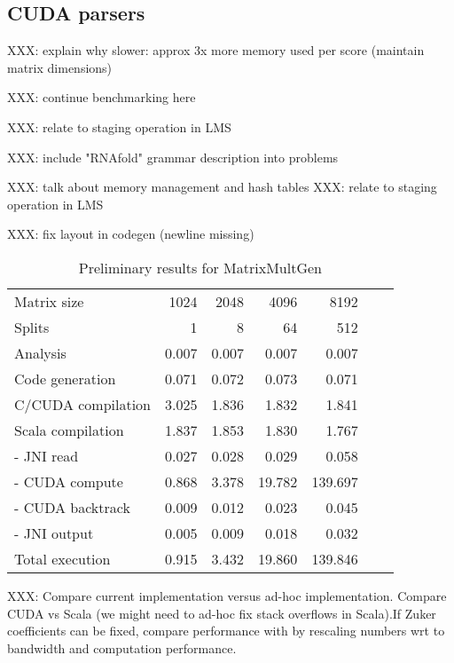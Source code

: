 \documentclass[11pt]{article}
\begin{document}
\subsection{CUDA parsers}
{\color{red} XXX: explain why slower: approx 3x more memory used per score (maintain matrix dimensions)

XXX: continue benchmarking here

XXX: relate to staging operation in LMS

XXX: include "RNAfold" grammar description into problems

XXX: talk about memory management and hash tables
XXX: relate to staging operation in LMS

XXX: fix layout in codegen (newline missing)

}
\begin{table}[H]\begin{center}\begin{tabular}{lrrrrrr} \toprule
Matrix size			& 1024	& 2048	& 4096	& 8192 \\
Splits				& 1		& 8		& 64		& 512 \\ \midrule
Analysis				& 0.007	& 0.007	& 0.007	& 0.007 \\
Code generation		& 0.071	& 0.072	& 0.073	& 0.071 \\
C/CUDA compilation	& 3.025	& 1.836	& 1.832	& 1.841 \\
Scala compilation		& 1.837	& 1.853	& 1.830	& 1.767 \\ \midrule
- JNI read				& 0.027	& 0.028	& 0.029	& 0.058 \\
- CUDA compute		& 0.868	& 3.378	& 19.782	& 139.697 \\
- CUDA backtrack		& 0.009	& 0.012	& 0.023	& 0.045 \\
- JNI output			& 0.005	& 0.009	& 0.018	& 0.032 \\
Total execution			& 0.915	& 3.432	& 19.860	& 139.846 \\ \bottomrule
\end{tabular}\end{center}\caption{Preliminary results for MatrixMultGen}\end{table}

{\color{red} XXX: Compare current implementation versus ad-hoc implementation. Compare CUDA vs Scala (we might need to ad-hoc fix stack overflows in Scala).If Zuker coefficients can be fixed, compare performance with \cite{adp_gpu} by rescaling numbers wrt to bandwidth and computation performance.}
\end{document}
